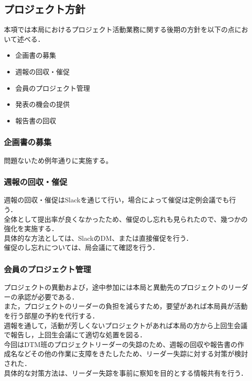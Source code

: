 ﻿\subsection*{プロジェクト方針}


本項では本局におけるプロジェクト活動業務に関する後期の方針を以下の点において述べる．

\begin{itemize}
\item 企画書の募集
\item 週報の回収・催促
\item 会員のプロジェクト管理
\item 発表の機会の提供
\item 報告書の回収
\end{itemize}

\subsubsection*{企画書の募集}

問題ないため例年通りに実施する。\\

\subsubsection*{週報の回収・催促}

週報の回収・催促はSlackを通じて行い，場合によって催促は定例会議でも行う．\\
全体として提出率が良くなかったため、催促のし忘れも見られたので、幾つかの強化を実施する．\\
具体的な方法としては、SlackのDM、または直接催促を行う．\\
催促のし忘れについては、局会議にて確認を行う．\\


\subsubsection*{会員のプロジェクト管理}

プロジェクトの異動および，途中参加には本局と異動先のプロジェクトのリーダーの承認が必要である．\\
また，プロジェクトのリーダーの負担を減らすため，要望があれば本局員が活動を行う部屋の予約を代行する．\\
週報を通して，活動が芳しくないプロジェクトがあれば本局の方から上回生会議で報告し，上回生会議にて適切な処置を図る．\\
今回はDTM班のプロジェクトリーダーの失踪のため、週報の回収や報告書の作成名などその他の作業に支障をきたしたため、リーダー失踪に対する対策が検討された．\\
具体的な対策方法は、リーダー失踪を事前に察知を目的とする情報共有を行う．\\

